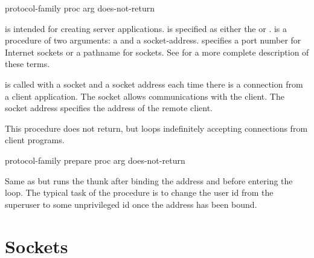  {protocol-family proc arg} {does-not-return}
\begin{desc}
 is intended for creating server
applications.  is specified as either the
 or .
 is a procedure of two arguments: a  and a
{socket-address}.  specifies a port number for Internet sockets
or a pathname for {\Unix} sockets. See  for a more complete
description of these terms.

 is called with a socket and a socket address each time there
is a connection from a client application. The socket allows
communications with the client.  The socket address specifies the
address of the remote client.

This procedure does not return, but loops indefinitely accepting
connections from client programs.
\end{desc}

 {protocol-family prepare proc arg} {does-not-return}
\begin{desc}
  Same as  but runs the thunk
   after binding the address and before entering the
  loop. The typical task of the  procedure is to change
  the user id from the superuser to some unprivileged id once the
  address has been bound.
\end{desc}

\section{Sockets}


